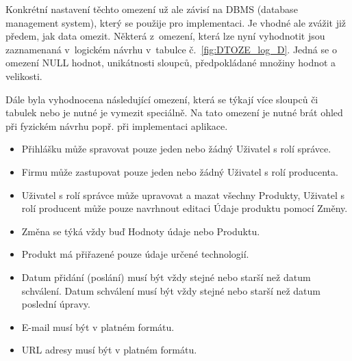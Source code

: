 \documentclass[11pt,a4paper]{article}
\begin{document}
Konkrétní nastavení těchto omezení už ale závisí na DBMS (database management system), který se použije pro implementaci. Je vhodné ale zvážit již předem, jak data omezit. Některá z~omezení, která lze nyní vyhodnotit jsou zaznamenaná v~logickém návrhu  v~tabulce č.~\ref{fig:DTOZE_log_D}. Jedná se o omezení NULL hodnot, unikátnosti sloupců, předpokládané množiny hodnot a velikosti. 

Dále byla vyhodnocena následující omezení, která se týkají více sloupců či tabulek nebo je nutné je vymezit speciálně. Na tato omezení je nutné brát ohled při fyzickém návrhu popř. při implementaci aplikace.

\begin{itemize}
\item Přihlášku může spravovat pouze jeden nebo žádný Uživatel s rolí správce.
\item Firmu může zastupovat pouze jeden nebo žádný Uživatel s rolí producenta.
\item Uživatel s rolí správce může upravovat a mazat všechny Produkty, Uživatel s rolí producent může pouze navrhnout editaci Údaje produktu pomocí Změny.
\item Změna se týká vždy buď Hodnoty údaje nebo Produktu.
\item Produkt má přiřazené pouze údaje určené technologií.
\item Datum přidání (poslání) musí být vždy stejné nebo starší než datum schválení. Datum schválení musí být vždy stejné nebo starší než datum poslední úpravy.
\item E-mail musí být v platném formátu.
\item URL adresy musí být v platném formátu.
\end{itemize}
\newpage
\end{document}
